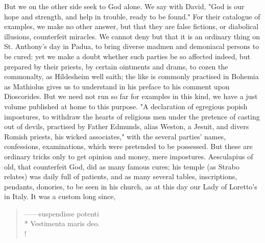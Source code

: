 {But we on the other side seek to God alone. We say with David,  "God is our hope and strength, and help in trouble, ready to be
found." For their catalogue of examples, we make no other answer, but that they
are false fictions, or diabolical illusions, counterfeit miracles. We cannot
deny but that it is an ordinary thing on St. Anthony's day in Padua, to bring
diverse madmen and demoniacal persons to be cured: yet we make a doubt whether
such parties be so affected indeed, but prepared by their priests, by certain
ointments and drams, to cozen the commonalty, as
Hildesheim well saith; the like is commonly practised in
Bohemia as Mathiolus gives us to understand in his preface to his comment upon
Dioscorides. But we need not run so far for examples in this kind, we have a
just volume published at home to this purpose. "A
declaration of egregious popish impostures, to withdraw the hearts of religious
men under the pretence of casting out of devils, practised by Father Edmunds,
alias Weston, a Jesuit, and divers Romish priests, his wicked associates," with
the several parties' names, confessions, examinations, \etc{} which were
pretended to be possessed. But these are ordinary tricks only to get opinion
and money, mere impostures. Aesculapius of old, that counterfeit God, did as
many famous cures; his temple (as Strabo relates) was
daily full of patients, and as many several tables, inscriptions, pendants,
donories, \etc{} to be seen in his church, as at this day our Lady of Loretto's
in Italy. It was a custom long since,

\begin{latin}
\begin{verse}%
------suspendisse potenti\\*
Vestimenta maris deo. \\!
\end{verse}%
\end{latin}

}
